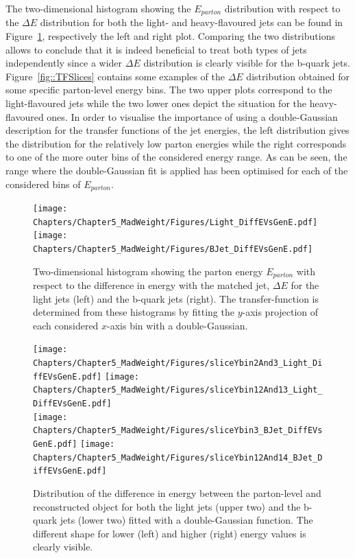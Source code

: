 The two-dimensional histogram showing the $E_{parton}$ distribution with respect to the $\Delta E$ distribution for both the light- and heavy-flavoured jets can be found in Figure~\ref{fig::TF2DPlot}, respectively the left and right plot.
Comparing the two distributions allows to conclude that it is indeed beneficial to treat both types of jets independently since a wider $\Delta E$ distribution is clearly visible for the b-quark jets.
\\
Figure~\ref{fig::TFSlices} contains some examples of the $\Delta E$ distribution obtained for some specific parton-level energy bins. The two upper plots correspond to the light-flavoured jets while the two lower ones depict the situation for the heavy-flavoured ones.
In order to visualise the importance of using a double-Gaussian description for the transfer functions of the jet energies, the left distribution gives the distribution for the relatively low parton energies while the right corresponds to one of the more outer bins of the considered energy range.
As can be seen, the range where the double-Gaussian fit is applied has been optimised for each of the considered bins of $E_{parton}$.

\begin{figure}[h!tp]
 \centering
 \texttt{[image: Chapters/Chapter5\_MadWeight/Figures/Light\_DiffEVsGenE.pdf]} \hspace{0.2cm}
 \texttt{[image: Chapters/Chapter5\_MadWeight/Figures/BJet\_DiffEVsGenE.pdf]} 
 \caption{Two-dimensional histogram showing the parton energy $E_{parton}$ with respect to the difference in energy with the matched jet, $\Delta E$ for the light jets (left) and the b-quark jets (right). The transfer-function is determined from these histograms by fitting the $y$-axis projection of each considered $x$-axis bin with a double-Gaussian.} \label{fig::TF2DPlot}
\end{figure}

\begin{figure}[h!tp]
 \centering
 \texttt{[image: Chapters/Chapter5\_MadWeight/Figures/sliceYbin2And3\_Light\_DiffEVsGenE.pdf]} \hspace{0.2cm}
 \texttt{[image: Chapters/Chapter5\_MadWeight/Figures/sliceYbin12And13\_Light\_DiffEVsGenE.pdf]} \vspace{0.1cm} \\
 \texttt{[image: Chapters/Chapter5\_MadWeight/Figures/sliceYbin3\_BJet\_DiffEVsGenE.pdf]} \hspace{0.2cm}
 \texttt{[image: Chapters/Chapter5\_MadWeight/Figures/sliceYbin12And14\_BJet\_DiffEVsGenE.pdf]}
 \caption{Distribution of the difference in energy between the parton-level and reconstructed object for both the light jets (upper two) and the b-quark jets (lower two) fitted with a double-Gaussian function. The different shape for lower (left) and higher (right) energy values is clearly visible.} 
\end{figure}

